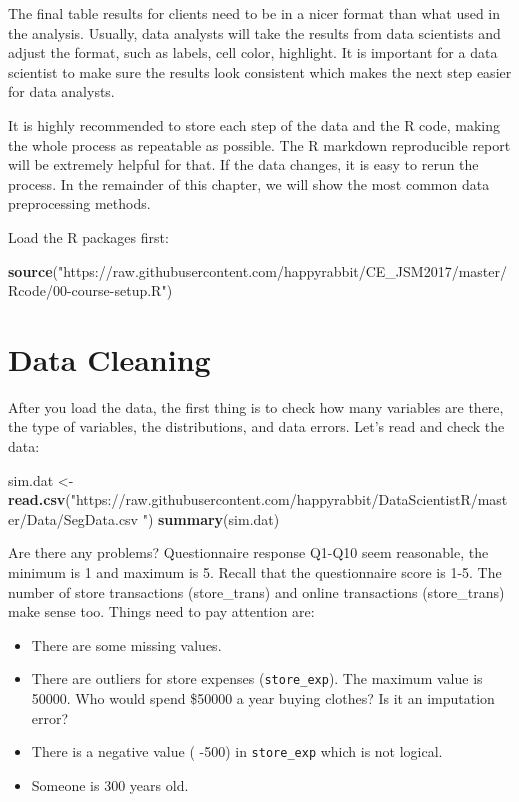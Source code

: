 \documentclass[12pt,]{krantz}
\makeatletter
\newenvironment{Shaded}{\begin{snugshade}}{\end{snugshade}}
\newcommand{\KeywordTok}[1]{\textcolor[rgb]{0.27,0.27,0.27}{\textbf{#1}}}
\newcommand{\StringTok}[1]{\textcolor[rgb]{0.5,0.5,0.5}{#1}}
\newcommand{\NormalTok}[1]{#1}
\providecommand{\tightlist}{%
  \setlength{\itemsep}{0pt}\setlength{\parskip}{0pt}}
\newenvironment{kframe}{%
\medskip{}
\setlength{\fboxsep}{.8em}
 \def\at@end@of@kframe{}%
 \ifinner\ifhmode%
  \def\at@end@of@kframe{\end{minipage}}%
  \begin{minipage}{\columnwidth}%
 \fi\fi%
 \def\FrameCommand##1{\hskip\@totalleftmargin \hskip-\fboxsep
 \colorbox{shadecolor}{##1}\hskip-\fboxsep
     \hskip-\linewidth \hskip-\@totalleftmargin \hskip\columnwidth}%
 \MakeFramed {\advance\hsize-\width
   \@totalleftmargin\z@ \linewidth\hsize
   \@setminipage}}%
 {\par\unskip\endMakeFramed%
 \at@end@of@kframe}
\renewenvironment{Shaded}{\begin{kframe}}{\end{kframe}}
\theoremstyle{definition}
\theoremstyle{definition}
\theoremstyle{definition}
\theoremstyle{remark}
\makeatother
\begin{document}
The final table results for clients need to be in a nicer format than
what used in the analysis. Usually, data analysts will take the results
from data scientists and adjust the format, such as labels, cell color,
highlight. It is important for a data scientist to make sure the results
look consistent which makes the next step easier for data analysts.

It is highly recommended to store each step of the data and the R code,
making the whole process as repeatable as possible. The R markdown
reproducible report will be extremely helpful for that. If the data
changes, it is easy to rerun the process. In the remainder of this
chapter, we will show the most common data preprocessing methods.

Load the R packages first:

\begin{Shaded}
\begin{Highlighting}[]
\KeywordTok{source}\NormalTok{(}\StringTok{"https://raw.githubusercontent.com/happyrabbit/CE_JSM2017/master/Rcode/00-course-setup.R"}\NormalTok{)}
\end{Highlighting}
\end{Shaded}

\section{Data Cleaning}\label{data-cleaning}

After you load the data, the first thing is to check how many variables
are there, the type of variables, the distributions, and data errors.
Let's read and check the data:

\begin{Shaded}
\begin{Highlighting}[]
\NormalTok{sim.dat <-}\StringTok{ }\KeywordTok{read.csv}\NormalTok{(}\StringTok{"https://raw.githubusercontent.com/happyrabbit/DataScientistR/master/Data/SegData.csv "}\NormalTok{)}
\KeywordTok{summary}\NormalTok{(sim.dat)}
\end{Highlighting}
\end{Shaded}

Are there any problems? Questionnaire response Q1-Q10 seem reasonable,
the minimum is 1 and maximum is 5. Recall that the questionnaire score
is 1-5. The number of store transactions (store\_trans) and online
transactions (store\_trans) make sense too. Things need to pay attention
are:

\begin{itemize}
\tightlist
\item
  There are some missing values.
\item
  There are outliers for store expenses (\texttt{store\_exp}). The
  maximum value is 50000. Who would spend \$50000 a year buying clothes?
  Is it an imputation error?
\item
  There is a negative value ( -500) in \texttt{store\_exp} which is not
  logical.
\item
  Someone is 300 years old.
\end{itemize}
\end{document}
